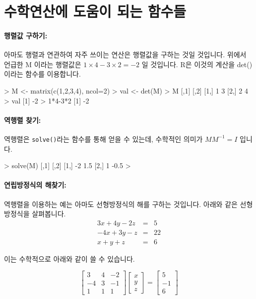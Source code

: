 \documentclass[../tutorial.tex]{subfiles}
\begin{document}
\section{수학연산에 도움이 되는 함수들}





\paragraph{행렬값 구하기: }  아마도 행렬과 연관하여 자주 쓰이는 연산은 행렬값을 구하는 것일 것입니다. 
위에서 언급한 M 이라는 행렬값은 $1\times 4 - 3\times 2 = -2$ 일 것입니다. 
R은 이것의 계산을 det()이라는 함수를 이용합니다. 

\begin{Schunk}
\begin{Soutput}
> M <- matrix(c(1,2,3,4), ncol=2)
> val <- det(M)
> M
     [,1] [,2]
[1,]    1    3
[2,]    2    4
> val
[1] -2
> 1*4-3*2
[1] -2
\end{Soutput}
\end{Schunk}


\paragraph{역행렬 찾기:} 역행렬은 \texttt{solve()}라는 함수를 통해 얻을 수 있는데, 수학적인 의미가 $M M^{-1} = I$ 입니다.

\begin{Schunk}
\begin{Soutput}
> solve(M)
     [,1] [,2]
[1,]   -2  1.5
[2,]    1 -0.5
>
\end{Soutput}
\end{Schunk}


\paragraph{연립방정식의 해찾기:} 역행렬을 이용하는 예는 아마도 선형방정식의 해를 구하는 것입니다. 
아래와 같은 선형방정식을 살펴봅니다. 
\begin{eqnarray}
3x + 4y - 2z & = & 5 \\
-4x + 3y - z & = & 22 \\
x + y + z & = & 6
\end{eqnarray}

이는 수학적으로 아래와 같이 쓸 수 있습니다. 

\begin{equation}
	\begin{bmatrix}
		3 & 4 & -2 \\
		-4 & 3 & -1 \\
		1 & 1 & 1 
	\end{bmatrix}
\begin{bmatrix}
	x \\
	y \\
	z 
\end{bmatrix}
= 
\begin{bmatrix}
	5 \\
	-1 \\
	6 
\end{bmatrix}
\end{equation}
\end{document}
